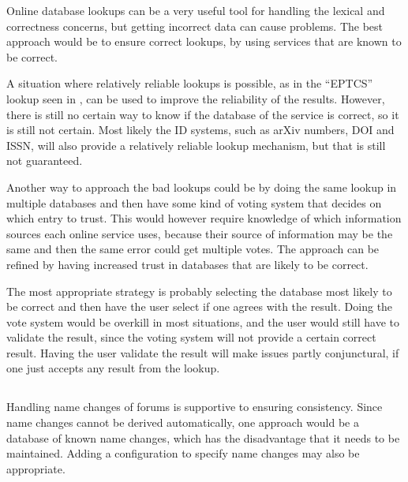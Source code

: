 Online database lookups can be a very useful tool for handling the
lexical and correctness concerns, but getting incorrect data can cause
problems.  The best approach would be to ensure correct lookups, by
using services that are known to be correct.

A situation where relatively reliable lookups is possible, as in the
``EPTCS'' lookup seen in , can be used to
improve the reliability of the results.  However, there is still no
certain way to know if the database of the service is correct, so it
is still not certain.  Most likely the ID systems, such as arXiv
numbers, DOI and ISSN, will also provide a relatively reliable lookup
mechanism, but that is still not guaranteed.

Another way to approach the bad lookups could be by doing the same
lookup in multiple databases and then have some kind of voting system
that decides on which entry to trust.  This would however require
knowledge of which information sources each online service uses,
because their source of information may be the same and then the same
error could get multiple votes.  The approach can be refined by having
increased trust in databases that are likely to be correct.

The most appropriate strategy is probably selecting the database most
likely to be correct and then have the user select if one agrees with
the result.  Doing the vote system would be overkill in most
situations, and the user would still have to validate the result, since
the voting system will not provide a certain correct result.  Having
the user validate the result will make issues partly conjunctural, if
one just accepts any result from the lookup.


\subsection{}

Handling name changes of forums is supportive to ensuring consistency.
Since name changes cannot be derived automatically, one approach would
be a database of known name changes, which has the disadvantage that
it needs to be maintained.  Adding a configuration to specify name
changes may also be appropriate.


\subsection{}

